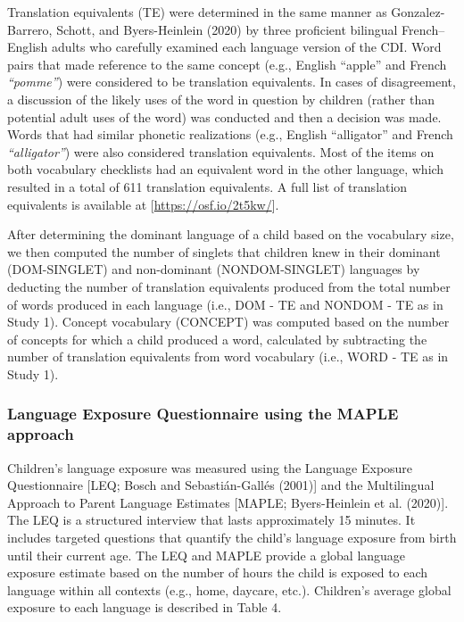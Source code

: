 \documentclass[
  english,
  ,man,floatsintext]{apa6}
\begin{document}
Translation equivalents (TE) were determined in the same manner as Gonzalez-Barrero, Schott, and Byers-Heinlein (2020) by three proficient bilingual French--English adults who carefully examined each language version of the CDI. Word pairs that made reference to the same concept (e.g., English ``apple'' and French \emph{``pomme''}) were considered to be translation equivalents. In cases of disagreement, a discussion of the likely uses of the word in question by children (rather than potential adult uses of the word) was conducted and then a decision was made. Words that had similar phonetic realizations (e.g., English ``alligator'' and French \emph{``alligator''}) were also considered translation equivalents. Most of the items on both vocabulary checklists had an equivalent word in the other language, which resulted in a total of 611 translation equivalents. A full list of translation equivalents is available at {[}\url{https://osf.io/2t5kw/}{]}.

After determining the dominant language of a child based on the vocabulary size, we then computed the number of singlets that children knew in their dominant (DOM-SINGLET) and non-dominant (NONDOM-SINGLET) languages by deducting the number of translation equivalents produced from the total number of words produced in each language (i.e., DOM - TE and NONDOM - TE as in Study 1). Concept vocabulary (CONCEPT) was computed based on the number of concepts for which a child produced a word, calculated by subtracting the number of translation equivalents from word vocabulary (i.e., WORD - TE as in Study 1).

\hypertarget{language-exposure-questionnaire-using-the-maple-approach}{%
\subsubsection{Language Exposure Questionnaire using the MAPLE approach}\label{language-exposure-questionnaire-using-the-maple-approach}}

Children's language exposure was measured using the Language Exposure Questionnaire {[}LEQ; Bosch and Sebastián-Gallés (2001){]} and the Multilingual Approach to Parent Language Estimates {[}MAPLE; Byers-Heinlein et al. (2020){]}. The LEQ is a structured interview that lasts approximately 15 minutes. It includes targeted questions that quantify the child's language exposure from birth until their current age. The LEQ and MAPLE provide a global language exposure estimate based on the number of hours the child is exposed to each language within all contexts (e.g., home, daycare, etc.). Children's average global exposure to each language is described in Table 4.
\end{document}
